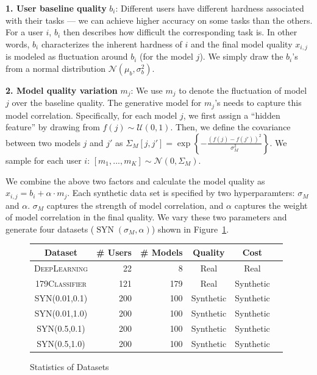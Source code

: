 \documentclass[letterpaper]{vldb}
\DeclareMathOperator{\SYN}{SYN}
\begin{document}
\noindent
{\bf 1. User baseline quality} $b_i$: Different 
users have different hardness associated with their tasks --- we can achieve higher accuracy on some tasks than the others.
For a user $i$, $b_i$ then describes how difficult the corresponding task is.
In other words, $b_i$ characterizes the inherent hardness of $i$ and the final model quality $x_{i,j}$ is modeled as fluctuation around $b_i$ (for the model $j$). We simply draw the $b_i$'s from a normal distribution $\mathcal{N}(\mu_b,\sigma_b^2)$.


\noindent
{\bf 2. Model quality variation} $m_j$: 
We use $m_j$ to denote the fluctuation of model $j$
over the baseline quality. The generative model for 
$m_j$'s needs to capture this model correlation.
Specifically, for each model $j$, we first assign a 
``hidden feature'' by drawing
from $f(j)\sim\mathcal{U}(0,1)$.
Then, we define the covariance between 
two models $j$ and $j'$ as 
$\Sigma_M[j, j']=\exp \left\{-\frac{(f(j) - f(j'))^2}{\sigma_M^2} \right\}$. We sample
for each user $i$: $
[m_1,...,m_K] \sim \mathcal{N}(0, \Sigma_M)$.

We combine the above two factors and 
calculate the model quality as $x_{i,j} = b_i + \alpha\cdot m_j$. Each synthetic data
set is specified by two hyperparamters:
$\sigma_M$ and $\alpha$. $\sigma_M$ captures
the strength of model correlation, and $\alpha$
captures the weight of model correlation in
the final quality. We vary these two
parameters and generate four datasets
($\SYN(\sigma_M, \alpha)$) shown in Figure~\ref{tab:datasets}.


\begin{figure}
\centering
\small
\begin{tabular}{c | r r | c c c}
\hline
{\bf Dataset} & {\bf \# Users} & {\bf \# Models} & {\bf Quality} & {\bf Cost} \\
\hline
\textsc{DeepLearning} & 22 & 8 & Real & Real \\
\textsc{179Classifier} & 121 & 179 & Real & Synthetic \\
\hline
\textsc{SYN(0.01,0.1)} & 200 & 100 & Synthetic & Synthetic \\
\textsc{SYN(0.01,1.0)} & 200 & 100 & Synthetic & Synthetic \\
\textsc{SYN(0.5,0.1)} & 200 & 100 & Synthetic & Synthetic \\
\textsc{SYN(0.5,1.0)} & 200 & 100 & Synthetic & Synthetic \\
\hline
\end{tabular}
\vspace{-1em}
\caption{Statistics of Datasets}
\label{tab:datasets}
\vspace{-1em}
\end{figure}
\end{document}
